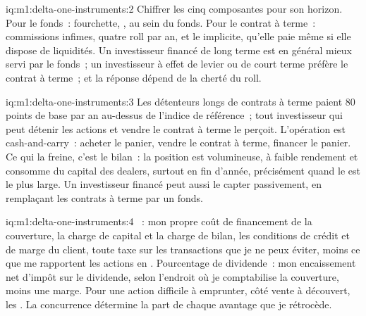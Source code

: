 \begin{solution}{iq:m1:delta-one-instruments:2}
Chiffrer les cinq composantes pour son horizon. Pour le fonds~: fourchette, ,
 au sein du fonds. Pour le contrat à terme~: commissions infimes, quatre roll
par an, et le  implicite, qu'elle paie même si elle dispose de
liquidités. Un investisseur financé de long terme est en général mieux servi par le fonds~; un
investisseur à effet de levier ou de court terme préfère le contrat à terme~; et la réponse
dépend de la cherté du roll.
\end{solution}

\begin{solution}{iq:m1:delta-one-instruments:3}
Les détenteurs longs de contrats à terme paient 80 points de base par an au-dessus de l'indice de référence~;
tout investisseur qui peut détenir les actions et vendre le contrat à terme le perçoit. L'opération est
cash-and-carry~: acheter le panier, vendre le contrat à terme, financer le panier. Ce qui
la freine, c'est le bilan~: la position est volumineuse, à faible rendement et consomme
du capital des dealers, surtout en fin d'année, précisément quand le  est le plus large. Un investisseur financé peut aussi le capter passivement, en remplaçant
les contrats à terme par un fonds.
\end{solution}

\begin{solution}{iq:m1:delta-one-instruments:4}
~: mon propre coût de financement de la couverture, la charge de capital et
la charge de bilan, les conditions de crédit et de marge du client, toute taxe
sur les transactions que je ne peux éviter, moins ce que me rapportent les actions en .
Pourcentage de dividende~: mon encaissement net d'impôt sur le dividende, selon l'endroit où je
comptabilise la couverture, moins une marge. Pour une action difficile à emprunter, côté vente à
découvert, les . La concurrence détermine la part de chaque avantage que je rétrocède.
\end{solution}

